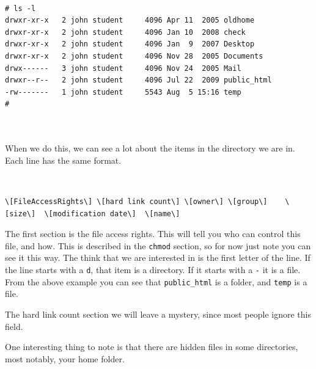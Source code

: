 
{\tt 
\begin{verbatim}
# ls -l
drwxr-xr-x   2 john student     4096 Apr 11  2005 oldhome
drwxr-xr-x   2 john student     4096 Jan 10  2008 check
drwxr-xr-x   2 john student     4096 Jan  9  2007 Desktop
drwxr-xr-x   2 john student     4096 Nov 28  2005 Documents
drwx------   3 john student     4096 Nov 24  2005 Mail
drwxr--r--   2 john student     4096 Jul 22  2009 public_html
-rw-------   1 john student     5543 Aug  5 15:16 temp
#



\end{verbatim}
}

When we do this, we can see a lot about the items in the directory we are in. Each line has the same format.
{\tt
\begin{verbatim}
\[FileAccessRights\] \[hard link count\] \[owner\] \[group\]    \[size\]  \[modification date\]  \[name\]
\end{verbatim}
}

The first section is the file access rights.  This will tell you who can control this file, and how.  This is described in the {\tt chmod} 
section, so for now just note you can see it this way.  The think that we are interested in is 
the first letter of the line.  If the line starts with a {\tt d}, that item is a directory.  If it starts with a {\tt -} it
is a file.  From the above example you can see that {\tt public\_html} is a folder, and {\tt temp} is a file.

The hard link count section we will leave a mystery, since most people ignore this field.

One interesting thing to note is that there are hidden files in some directories, most notably, your home folder.

